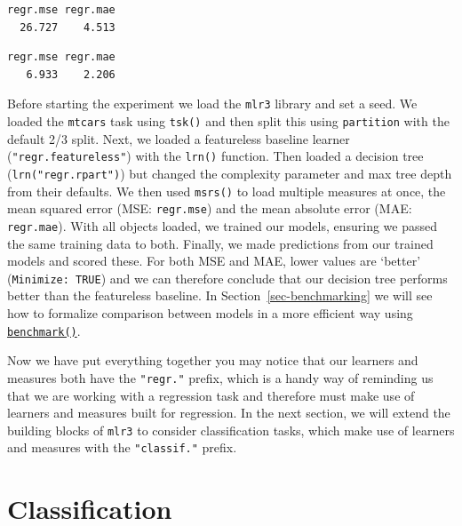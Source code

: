 \begin{verbatim}
regr.mse regr.mae 
  26.727    4.513 
\end{verbatim}

\begin{Shaded}
\begin{Highlighting}[]
\SpecialCharTok{$}\SpecialCharTok{$}\SpecialCharTok{$}
\end{Highlighting}
\end{Shaded}

\begin{verbatim}
regr.mse regr.mae 
   6.933    2.206 
\end{verbatim}

Before starting the experiment we load the \texttt{mlr3} library and set
a seed. We loaded the \texttt{mtcars} task using \texttt{tsk()} and then
split this using \texttt{partition} with the default 2/3 split. Next, we
loaded a featureless baseline learner (\texttt{"regr.featureless"}) with
the \texttt{lrn()} function. Then loaded a decision tree
(\texttt{lrn("regr.rpart")}) but changed the complexity parameter and
max tree depth from their defaults. We then used \texttt{msrs()} to load
multiple measures at once, the mean squared error (MSE:
\texttt{regr.mse}) and the mean absolute error (MAE: \texttt{regr.mae}).
With all objects loaded, we trained our models, ensuring we passed the
same training data to both. Finally, we made predictions from our
trained models and scored these. For both MSE and MAE, lower values are
`better' (\texttt{Minimize:\ TRUE}) and we can therefore conclude that
our decision tree performs better than the featureless baseline. In
Section~\ref{sec-benchmarking} we will see how to formalize comparison
between models in a more efficient way using
\href{https://mlr3.mlr-org.com/reference/benchmark.html}{\texttt{benchmark()}}.

Now we have put everything together you may notice that our learners and
measures both have the \texttt{"regr."} prefix, which is a handy way of
reminding us that we are working with a regression task and therefore
must make use of learners and measures built for regression. In the next
section, we will extend the building blocks of \texttt{mlr3} to consider
classification tasks, which make use of learners and measures with the
\texttt{"classif."} prefix.

\hypertarget{sec-classif}{%
\section{Classification}\label{sec-classif}}

